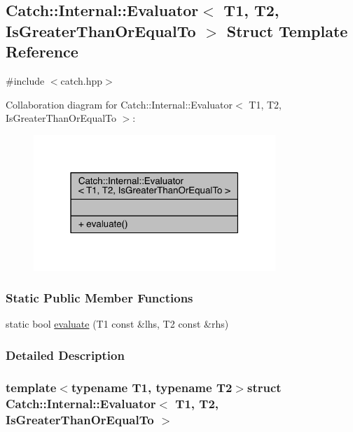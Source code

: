 \hypertarget{a00021}{}\subsection{Catch\+:\+:Internal\+:\+:Evaluator$<$ T1, T2, Is\+Greater\+Than\+Or\+Equal\+To $>$ Struct Template Reference}
\label{a00021}


{\ttfamily \#include $<$catch.\+hpp$>$}



Collaboration diagram for Catch\+:\+:Internal\+:\+:Evaluator$<$ T1, T2, Is\+Greater\+Than\+Or\+Equal\+To $>$\+:\nopagebreak
\begin{figure}[H]
\begin{center}
\leavevmode
\includegraphics[width=259pt]{a00314}
\end{center}
\end{figure}
\subsubsection*{Static Public Member Functions}
\begin{DoxyCompactItemize}
\item 
static bool \hyperlink{a00021_a5ba107c6da4292b6492a0e5e906f9484}{evaluate} (T1 const \&lhs, T2 const \&rhs)
\end{DoxyCompactItemize}


\subsubsection{Detailed Description}
\subsubsection*{template$<$typename T1, typename T2$>$struct Catch\+::\+Internal\+::\+Evaluator$<$ T1, T2, Is\+Greater\+Than\+Or\+Equal\+To $>$}




